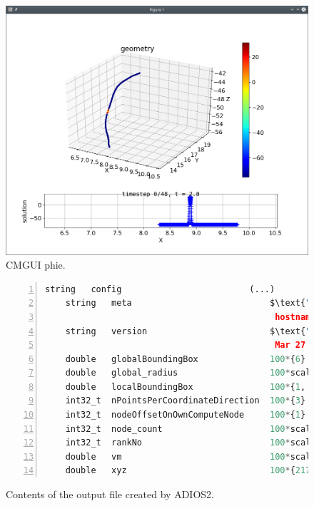 \begin{figure}%
  \centering%
  \includegraphics[width=\textwidth]{images/implementation/python_output.png}%
  \caption{CMGUI phie.}%
  \label{fig:python_output}%
\end{figure}%


\begin{figure}
\centering
\begin{framed}
\begin{lstlisting}[basicstyle=\footnotesize\ttfamily,commentstyle=\color{gray},numbers=left,language=python]
    string   config                         (...)
    string   meta                           $\text{"}$current time: 2021/3/27 16:59:35,$\textcolor{gray}{\hookleftarrow}$
                                             hostname: lapsgs05, n ranks: 1$\text{"}$
    string   version                        $\text{"}$opendihu 1.2, built $\textcolor{gray}{\hookleftarrow}$
                                             Mar 27 2021, C++ 201402, GCC 7.5.0$\text{"}$
    double   globalBoundingBox              100*{6} = -56.3 / 19.8598
    double   global_radius                  100*scalar = 0.0358984 / 0.0358984
    double   localBoundingBox               100*{1, 6} = -56.3 / 19.8598
    int32_t  nPointsPerCoordinateDirection  100*{3} = 0 / 1481
    int32_t  nodeOffsetOnOwnComputeNode     100*{1} = 0 / 0
    int32_t  node_count                     100*scalar = 72569 / 72569
    int32_t  rankNo                         100*scalar = 0 / 0
    double   vm                             100*scalar = 0 / 0
    double   xyz                            100*{217707} = -56.3 / 19.8598
\end{lstlisting}
\end{framed}
\caption{Contents of the output file created by ADIOS2.}%
\label{fig:adios_output}%
\end{figure}             


